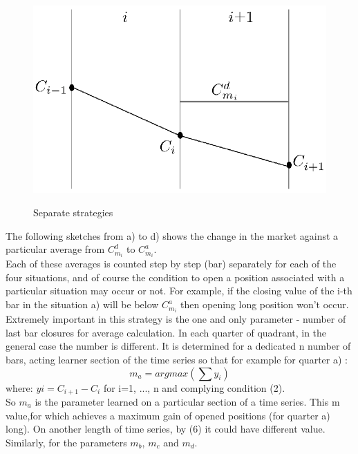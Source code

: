 \documentclass{tewiart}
\begin{document}
\begin{figure}[h]
\begin{minipage}{.49\linewidth}
\label{cztero}
\end{minipage}
\begin{minipage}{.49\linewidth}
\centering 
\includegraphics[width=\textwidth]{rysunek2d.eps}
\label{mansard}
\end{minipage}
\caption{Separate strategies}
\end{figure}
\FloatBarrier
\indent The following sketches from a) to d) shows the change in the market against a particular average from $C^d_{m_{i}}$ to $C^a_{m_{i}}$.\\
\indent Each of these averages is counted step by step (bar) separately for each of the four situations, and of course the condition to open a position associated with a particular situation may occur or not. For example, if the closing value of the i-th bar in the situation a) will be below $C^a_{m_{i}}$ then opening long position won't occur.\\
\indent Extremely important in this strategy is the one and only parameter - number of last bar closures for average calculation. In each quarter of quadrant, in the general case the number is different. It is determined for a dedicated n number of bars, acting learner section of the time series so that for example for quarter a) :\\
\begin{equation}
	m_a = argmax (\sum y_i  )
\end{equation}
where: $yi = C_{i+1} - C_{i}$ for i=1, ..., n and complying  condition (2).\\
\indent So $m_{a}$ is the parameter learned on a particular section of a time series. This m value,for which achieves a maximum gain of opened positions (for quarter a) long). On another length of time series, by (6) it could have different value. Similarly, for the parameters $m_{b}$, $m_{c}$ and $m_{d}$.\\
\end{document}
